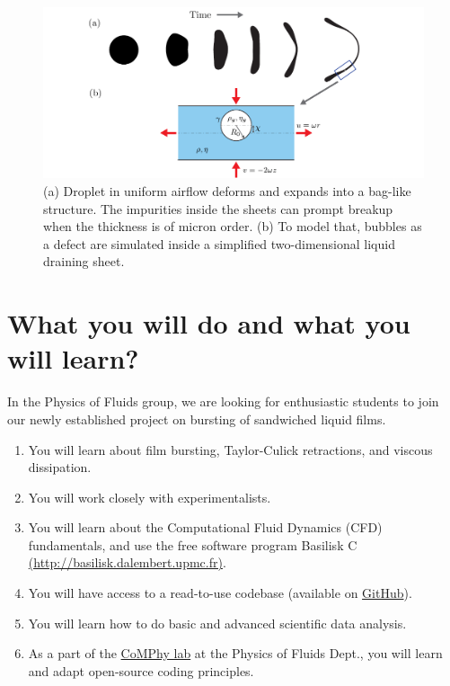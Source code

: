 \documentclass[11pt]{article}
\begin{document}
\begin{figure}[h]
\centering
\includegraphics[width=\textwidth]{schematic_02.pdf}
\caption{(a) Droplet in uniform airflow deforms and expands into a bag-like structure. The impurities inside the sheets can prompt breakup when the thickness is of micron order. (b) To model that, bubbles as a defect are simulated inside a simplified two-dimensional liquid draining sheet.}
\label{fig:droplets2021}
\end{figure}

\section*{What you will do and what you will learn?}
In the Physics of Fluids group, we are looking for enthusiastic students to join our newly established project on bursting of sandwiched liquid films.

\begin{enumerate}
\item You will learn about film bursting, Taylor-Culick retractions, and viscous dissipation. 
\item You will work closely with experimentalists. 
\item You will learn about the Computational Fluid Dynamics (CFD) fundamentals, and use the free software program Basilisk C \href{http://basilisk.dalembert.upmc.fr}{(http://basilisk.dalembert.upmc.fr)}.
\item You will have access to a read-to-use codebase (available on \href{https://github.com/comphy-lab/bubbleinSheet}{GitHub}).
\item You will learn how to do basic and advanced scientific data analysis.
\item As a part of the \href{https://comphy-lab.org}{CoMPhy lab} at the Physics of Fluids Dept., you will learn and adapt open-source coding principles. 
\end{enumerate}
\end{document}
